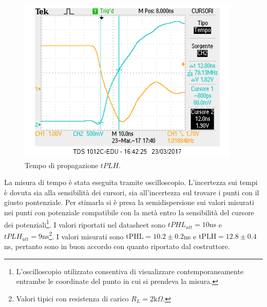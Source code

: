 \documentclass[10pt,a4paper]{article}
\begin{document}
\begin{figure}[!htb]
\centering
\includegraphics[scale=0.6]{tplh.png}
\caption{Tempo di propagazione $tPLH$.\label{fig:tplh}}
\end{figure}
La misura di tempo è stata eseguita tramite oscilloscopio. L'incertezza sui tempi è dovuta sia alla sensibilità dei cursori, sia all'incertezza sul trovare i punti con il giusto pontenziale. Per stimarla si è presa la semidispersione sui valori misurati nei punti con potenziale compatibile con la metà entro la sensibilità del cursore dei potenziali\footnote{L'oscilloscopio utilizzato consentiva di visualizzare contemporaneamente entrambe le coordinate del punto in cui si prendeva la misura.}.
I valori riportati nel datasheet sono
$tPHL_{att}=10 \mbox{ns}$ e $tPLH_{att}= 9\mbox{ns}$\footnote{Valori tipici con resistenza di carico $R_L = 2\mbox{k}\Omega$.}. 
I valori misurati sono $\mbox{tPHL} = 10.2\pm0.2$ns  e $\mbox{tPLH} = 12.8\pm0.4$ns, pertanto sono in buon accordo con quanto riportato dal costruttore.

\end{document}
